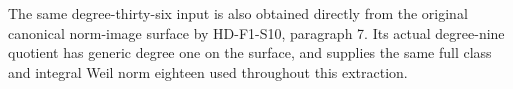 The same degree-thirty-six input is also obtained directly from
the original canonical norm-image surface by HD-F1-S10, paragraph 7.
Its actual degree-nine quotient has generic degree one on the
surface, and supplies the same full class and integral Weil norm
eighteen used throughout this extraction.
